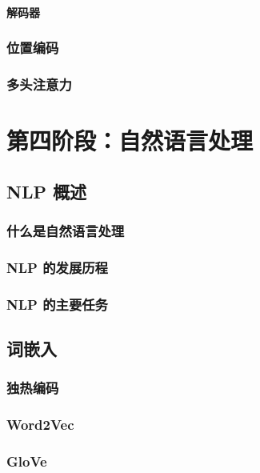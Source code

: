 \documentclass[12pt,UTF8]{ctexbook}
\begin{document}
\subsection{解码器}

\section{位置编码}

\section{多头注意力}

\part{第四阶段：自然语言处理}

\chapter{NLP 概述}
\label{chap:nlp_overview}

\section{什么是自然语言处理}

\section{NLP 的发展历程}

\section{NLP 的主要任务}

\chapter{词嵌入}
\label{chap:word_embedding}

\section{独热编码}

\section{Word2Vec}

\section{GloVe}
\end{document}
